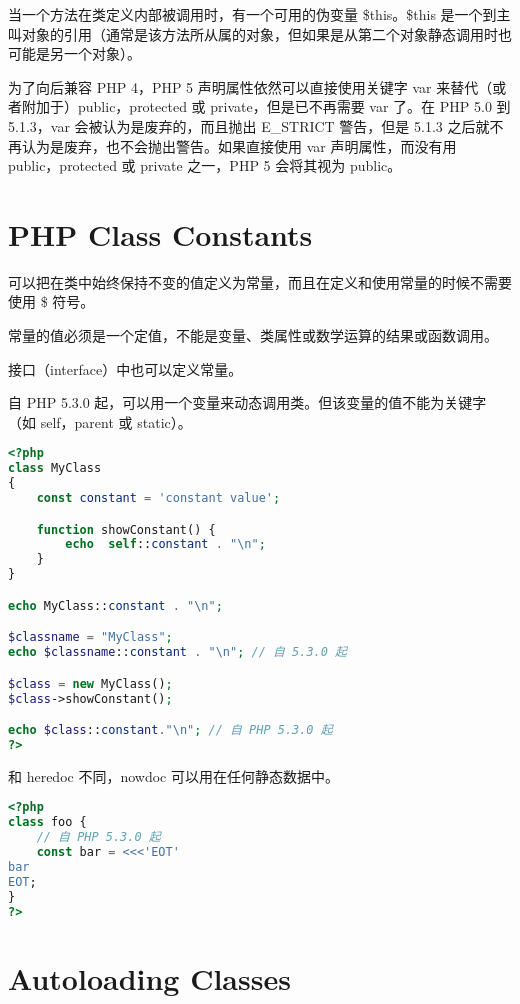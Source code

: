 当一个方法在类定义内部被调用时，有一个可用的伪变量 \$this。\$this 是一个到主叫对象的引用（通常是该方法所从属的对象，但如果是从第二个对象静态调用时也可能是另一个对象）。


为了向后兼容 PHP 4，PHP 5 声明属性依然可以直接使用关键字 var 来替代（或者附加于）public，protected 或 private，但是已不再需要 var 了。在 PHP 5.0 到 5.1.3，var 会被认为是废弃的，而且抛出 E\_STRICT 警告，但是 5.1.3 之后就不再认为是废弃，也不会抛出警告。如果直接使用 var 声明属性，而没有用 public，protected 或 private 之一，PHP 5 会将其视为 public。



\chapter{PHP Class Constants}


可以把在类中始终保持不变的值定义为常量，而且在定义和使用常量的时候不需要使用 \$ 符号。

常量的值必须是一个定值，不能是变量、类属性或数学运算的结果或函数调用。

接口（interface）中也可以定义常量。

自 PHP 5.3.0 起，可以用一个变量来动态调用类。但该变量的值不能为关键字（如 self，parent 或 static）。





\begin{lstlisting}[language=PHP]
<?php
class MyClass
{
    const constant = 'constant value';

    function showConstant() {
        echo  self::constant . "\n";
    }
}

echo MyClass::constant . "\n";

$classname = "MyClass";
echo $classname::constant . "\n"; // 自 5.3.0 起

$class = new MyClass();
$class->showConstant();

echo $class::constant."\n"; // 自 PHP 5.3.0 起
?>
\end{lstlisting}

和 heredoc 不同，nowdoc 可以用在任何静态数据中。





\begin{lstlisting}[language=PHP]
<?php
class foo {
    // 自 PHP 5.3.0 起
    const bar = <<<'EOT'
bar
EOT;
}
?>
\end{lstlisting}


\chapter{Autoloading Classes}

